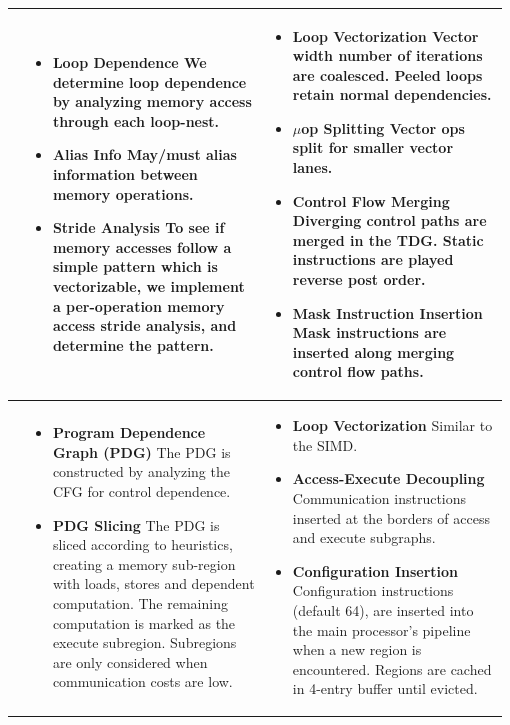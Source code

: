 \begin{table}[h]
\begin{adjustwidth}{-0.6in}{-0.6in}
\begin{center}
\begin{tabular}{m{0.02\linewidth}m{0.48\linewidth}m{0.48\linewidth}}
\parbox[t]{1mm}{} 
&
  \begin{itemize}
  \item \textbf{Loop Dependence}
   We determine loop dependence by analyzing memory access through each loop-nest.
  \item \textbf{Alias Info}
  May/must alias information between memory operations.
  \item \textbf{Stride Analysis}
  To see if memory accesses follow a simple pattern which is vectorizable, we implement
  a per-operation memory access stride analysis, and determine the pattern.
  \end{itemize}
&
  \begin{itemize}
  \item \textbf{Loop Vectorization}
  Vector width number of iterations are coalesced.
  Peeled loops retain normal dependencies.
  \item \textbf{$\mu$op Splitting}
  Vector ops split for smaller vector lanes.
  \item \textbf{Control Flow Merging}
  Diverging control paths are merged in the TDG.  
  Static instructions are played reverse post order.
  \item \textbf{Mask Instruction Insertion}
  Mask instructions are inserted along merging control flow paths.
  \end{itemize}
 
\\  [-0.6\normalbaselineskip] \midrule


\parbox[t]{1mm}{} 
&
 \begin{itemize}
  \item \textbf{Program Dependence Graph (PDG)}
  The PDG is constructed by analyzing the CFG for control dependence.
  \item \textbf{PDG Slicing}
  The PDG is sliced according to heuristics, creating 
  a memory sub-region with loads, stores and dependent computation.
  The remaining computation is marked as the execute subregion.
  Subregions are only considered when communication costs are low.
\end{itemize}

& 
 \begin{itemize}
\item \textbf{Loop Vectorization}
Similar to the SIMD.
\item \textbf{Access-Execute Decoupling}
Communication instructions inserted at the borders of access 
and execute subgraphs.
\item \textbf{Configuration Insertion}
Configuration instructions (default 64), are inserted into the
main processor's pipeline when a new region is encountered.  Regions are
cached in 4-entry buffer until evicted.
\end{itemize}


\end{tabular}
\end{center}
\end{adjustwidth}
\end{table}
